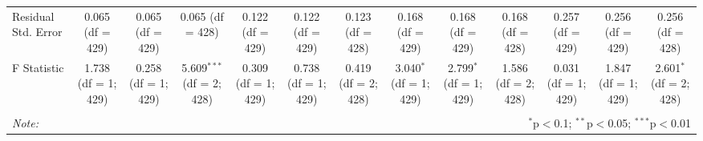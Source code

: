 \begin{table}[!htbp]
\begin{tabular}{@{\extracolsep{5pt}}lcccccccccccc}
Residual Std. Error & 0.065 (df = 429) & 0.065 (df = 429) & 0.065 (df = 428) & 0.122 (df = 429) & 0.122 (df = 429) & 0.123 (df = 428) & 0.168 (df = 429) & 0.168 (df = 429) & 0.168 (df = 428) & 0.257 (df = 429) & 0.256 (df = 429) & 0.256 (df = 428) \\ 
F Statistic & 1.738 (df = 1; 429) & 0.258 (df = 1; 429) & 5.609$^{***}$ (df = 2; 428) & 0.309 (df = 1; 429) & 0.738 (df = 1; 429) & 0.419 (df = 2; 428) & 3.040$^{*}$ (df = 1; 429) & 2.799$^{*}$ (df = 1; 429) & 1.586 (df = 2; 428) & 0.031 (df = 1; 429) & 1.847 (df = 1; 429) & 2.601$^{*}$ (df = 2; 428) \\ 
\hline 
\hline \\[-1.8ex] 
\textit{Note:}  & \multicolumn{12}{r}{$^{*}$p$<$0.1; $^{**}$p$<$0.05; $^{***}$p$<$0.01} \\ 
\end{tabular} 
\end{table} 
